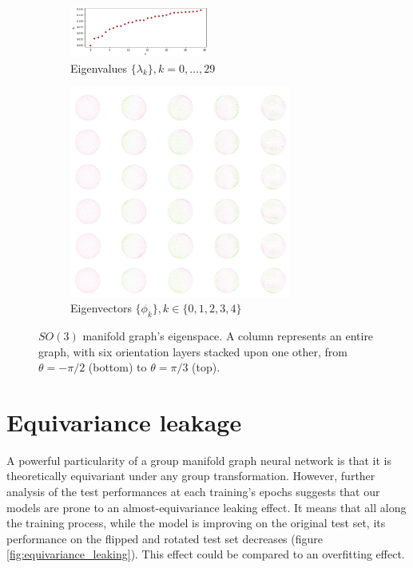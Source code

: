 \documentclass{article}
\begin{document}
\begin{figure}[h!] 
    \centering
    \begin{subfigure}[b]{0.9\textwidth}
        \centering
        \includegraphics[width=0.5\textwidth]{Images/so3_eigenvals.png}
        \caption{Eigenvalues $\{\lambda_k\}, k=0, \dots, 29$}
    \end{subfigure}
    \hfill
    \begin{subfigure}[b]{\textwidth}
        \centering
        \includegraphics[width=0.8\textwidth]{Images/so3_eigenvecs.png}
        \caption{Eigenvectors $\{\phi_k\}, k \in \{0, 1, 2, 3, 4\}$}
    \end{subfigure}
    \caption{$SO(3)$ manifold graph's eigenspace. A column represents an entire graph, with six orientation layers stacked upon one other, from $\theta = -\pi/2$ (bottom) to $\theta = \pi/3$ (top).}
    \label{fig:so3_eigenspace}
\end{figure}

\clearpage

\section{Equivariance leakage} \label{app:equivariance_leakage}

A powerful particularity of a group manifold graph neural network is that it is theoretically equivariant under any group transformation. However, further analysis of the test performances at each training's epochs suggests that our models are prone to an almost-equivariance leaking effect. It means that all along the training process, while the model is improving on the original test set, its performance on the flipped and rotated test set decreases (figure \ref{fig:equivariance_leaking}). This effect could be compared to an overfitting effect. 
\end{document}
